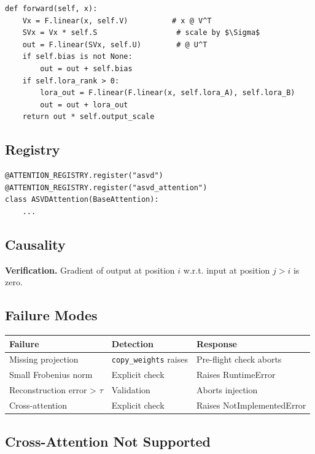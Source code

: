 \begin{lstlisting}
def forward(self, x):
    Vx = F.linear(x, self.V)          # x @ V^T
    SVx = Vx * self.S                  # scale by $\Sigma$
    out = F.linear(SVx, self.U)        # @ U^T
    if self.bias is not None:
        out = out + self.bias
    if self.lora_rank > 0:
        lora_out = F.linear(F.linear(x, self.lora_A), self.lora_B)
        out = out + lora_out
    return out * self.output_scale
\end{lstlisting}

\subsection{Registry}

\begin{lstlisting}
@ATTENTION_REGISTRY.register("asvd")
@ATTENTION_REGISTRY.register("asvd_attention")
class ASVDAttention(BaseAttention):
    ...
\end{lstlisting}

\subsection{Causality}

\textbf{Verification.} Gradient of output at position $i$ w.r.t. input at 
position $j > i$ is zero.

\subsection{Failure Modes}

\begin{table}[H]
\centering
\small
\begin{tabular}{lll}
\toprule
\textbf{Failure} & \textbf{Detection} & \textbf{Response} \\
\midrule
Missing projection & \texttt{copy\_weights} raises & Pre-flight check aborts \\
Small Frobenius norm & Explicit check & Raises RuntimeError \\
Reconstruction error > $\tau$ & Validation & Aborts injection \\
Cross-attention & Explicit check & Raises NotImplementedError \\
\bottomrule
\end{tabular}
\end{table}

\subsection{Cross-Attention Not Supported}

